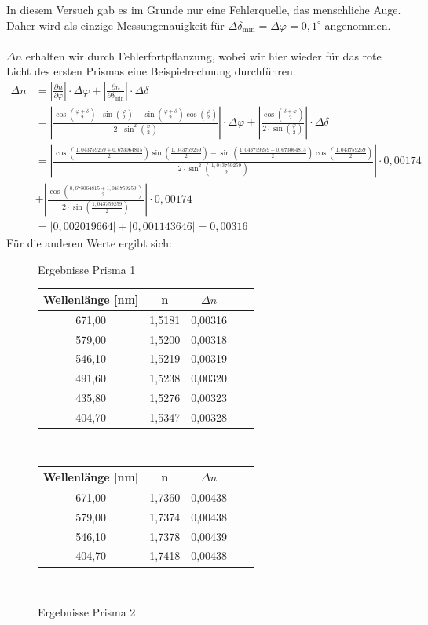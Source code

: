 \documentclass[fontsize=12pt]{scrartcl}
\renewcommand{\l}{\left\vert}
\renewcommand{\r}{\right\vert}
\begin{document}
In diesem Versuch gab es im Grunde nur eine Fehlerquelle, das menschliche Auge. Daher wird als einzige 
Messungenauigkeit für $\Delta \delta_{\text{min}}=\Delta \varphi=0,1^{\circ}$ angenommen.\\
~\\
$\Delta n$ erhalten wir durch Fehlerfortpflanzung, wobei wir hier wieder für das rote Licht des ersten Prismas eine Beispielrechnung durchführen.
\begin{align*}
\Delta n &= \l \frac{\partial n}{\partial \varphi} \r \cdot \Delta \varphi + \l \frac{\partial n}{\partial \delta_{\text{min}}} \r \cdot \Delta\delta \\
&= \l \frac{\cos(\frac{\varphi + \delta}{2}) \cdot \sin({\frac{\varphi}{2}}) - \sin(\frac{\varphi + \delta}{2}) \cos(\frac{\varphi}{2})}{2\cdot 
\sin^2(\frac{\varphi}{2})}\r \cdot \Delta\varphi + \l \frac{\cos(\frac{\delta +\varphi}{2})}{2\cdot \sin(\frac{\varphi}{2})} \r  \cdot \Delta\delta\\
%
&= \l \frac{\cos(\frac{1,043759259 + 0,673064815}{2}) \sin({\frac{1,043759259}{2}}) - \sin(\frac{1,043759259 + 0,673064815}{2}) \cos(\frac{1,043759259}{2})}{2\cdot \sin^2(\frac{1,043759259}{2})}\r \cdot 0,00174
 \\
&+ \l \frac{\cos(\frac{0,673064815+1,043759259}{2})}{2\cdot \sin(\frac{1,043759259}{2})} \r  \cdot 0,00174
 \\
&= \l 0,002019664
 \r + \l 0,001143646
 \r = 0,00316
\end{align*}
\noindent
Für die anderen Werte ergibt sich:
\begin{figure}[h]
\begin{minipage}{0.5\textwidth}
\centering
\caption{Ergebnisse Prisma 1}
\begin{tabular}{|c|c|c|c|c|} \hline
Wellenlänge [nm]  & n & $\Delta n$ \\ \hline
671,00 &1,5181 &0,00316
\\ \hline
579,00	&1,5200 &0,00318
\\ \hline
546,10	&1,5219 &0,00319
\\ \hline
491,60	&1,5238 &0,00320
\\ \hline
435,80	&1,5276 &0,00323
\\ \hline
404,70	&1,5347 &0,00328
\\ \hline
\end{tabular} \\
\end{minipage}
\begin{minipage}{0.5\textwidth}
\vspace{-30pt}
\centering
\caption{Ergebnisse Prisma 2}
\begin{tabular}{|c|c|c|c|c|} \hline
Wellenlänge [nm] &  n & $\Delta n$  \\ \hline
671,00	&1,7360 &0,00438
\\ \hline
579,00	&1,7374 &0,00438
\\ \hline
546,10	&1,7378 &0,00439
\\ \hline
404,70	&1,7418 &0,00438
\\ \hline
\end{tabular} \\
\end{minipage}
\end{figure}
\end{document}
